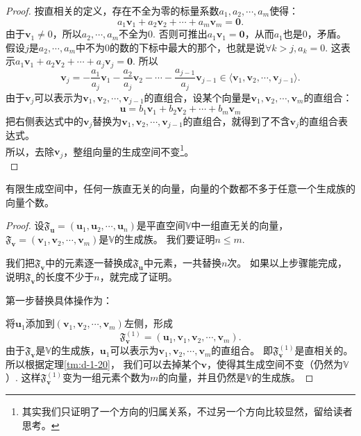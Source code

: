\documentclass[12pt,UTF8]{ctexbook}
\begin{document}
\begin{appendix}
\begin{proof}
    按直相关的定义，存在不全为零的标量系数$a_1, a_2, \cdots, a_m$使得：
    $$ a_1\mathbf{v}_1+a_2\mathbf{v}_2+\cdots+a_m\mathbf{v}_m = \mathbf{0}. $$
    由于$\mathbf{v}_1 \neq 0$，所以$a_2, \cdots, a_m$不全为0. 否则可推出$a_1\mathbf{v}_1 = \mathbf{0}$，从而$a_1$也是0，矛盾。\\
    假设$j$是$a_2, \cdots, a_m$中不为0的数的下标中最大的那个，也就是说$\forall k > j, a_k = 0$. 这表示$ a_1\mathbf{v}_1+a_2\mathbf{v}_2+\cdots+a_j\mathbf{v}_j = \mathbf{0}. $
    所以
    $$ \mathbf{v}_j = -\frac{a_1}{a_j}\mathbf{v}_1-\frac{a_2}{a_j}\mathbf{v}_2-\cdots-\frac{a_{j-1}}{a_j}\mathbf{v}_{j-1} \in \langle \mathbf{v}_1, \mathbf{v}_2 , \cdots , \mathbf{v}_{j-1}\rangle. $$
    由于$ \mathbf{v}_j$可以表示为$\mathbf{v}_1, \mathbf{v}_2 , \cdots , \mathbf{v}_{j-1}$的直组合，设某个向量是$\mathbf{v}_1, \mathbf{v}_2 , \cdots , \mathbf{v}_m$的直组合：
    $$ \mathbf{u} = b_1\mathbf{v}_1+b_2\mathbf{v}_2+\cdots+b_m\mathbf{v}_m$$
    把右侧表达式中的$\mathbf{v}_j$替换为$\mathbf{v}_1, \mathbf{v}_2 , \cdots , \mathbf{v}_{j-1}$的直组合，就得到了不含$\mathbf{v}_j$的直组合表达式。\\
    所以，去除$\mathbf{v}_j$，整组向量的生成空间不变\footnote{其实我们只证明了一个方向的归属关系，不过另一个方向比较显然，留给读者思考。}。\\
\end{proof}

\begin{tm}\label{tm:d-1-30}
    有限生成空间中，任何一族直无关的向量，向量的个数都不多于任意一个生成族的向量个数。
\end{tm}

\begin{proof}
    
    设$\mathfrak{F}_{\mathbf{u}} = (\mathbf{u}_1, \mathbf{u}_2, \cdots , \mathbf{u}_n )$是平直空间$\mathbb{V}$中一组直无关的向量，
    $\mathfrak{F}_{\mathbf{v}} = (\mathbf{v}_1, \mathbf{v}_2, \cdots , \mathbf{v}_m )$是$\mathbb{V}$的生成族。
    我们要证明$n \leq m$. 

    我们把$\mathfrak{F}_{\mathbf{v}}$中的元素逐一替换成$\mathfrak{F}_{\mathbf{u}}$中元素，一共替换$n$次。
    如果以上步骤能完成，说明$\mathfrak{F}_{\mathbf{v}}$的长度不少于$n$，就完成了证明。

    第一步替换具体操作为：

    将$\mathbf{u}_1$添加到$(\mathbf{v}_1, \mathbf{v}_2, \cdots , \mathbf{v}_m )$左侧，形成
    $$\mathfrak{F}_{\mathbf{v}}^{(1)} = (\mathbf{u}_1, \mathbf{v}_1, \mathbf{v}_2, \cdots , \mathbf{v}_m ).$$
    由于$\mathfrak{F}_{\mathbf{v}}$是$\mathbb{V}$的生成族，$\mathbf{u}_1$可以表示为$\mathbf{v}_1, \mathbf{v}_2, \cdots , \mathbf{v}_m$的直组合。
    即$\mathfrak{F}_{\mathbf{v}}^{(1)}$是直相关的。所以根据定理\ref{tm:d-1-20}，
    我们可以去掉某个$\mathbf{v}$，使得其生成空间不变（仍然为$\mathbb{V}$）.
    这样$\mathfrak{F}_{\mathbf{v}}^{(1)}$变为一组元素个数为$m$的向量，并且仍然是$\mathbb{V}$的生成族。
    

\end{proof}
\end{appendix}
\end{document}

